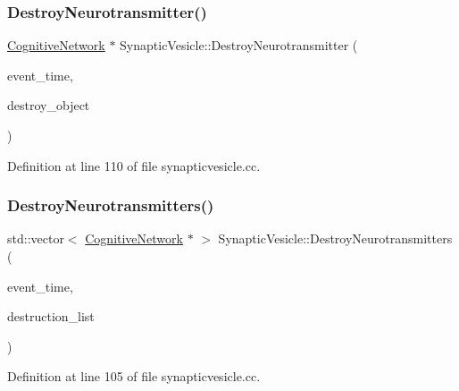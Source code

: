 \subsubsection{\texorpdfstring{Destroy\+Neurotransmitter()}{DestroyNeurotransmitter()}}
{\footnotesize\ttfamily \mbox{\hyperlink{class_cognitive_network}{Cognitive\+Network}} $\ast$ Synaptic\+Vesicle\+::\+Destroy\+Neurotransmitter (\begin{DoxyParamCaption}\item[{std\+::chrono\+::time\+\_\+point$<$ \mbox{\hyperlink{universe_8h_a0ef8d951d1ca5ab3cfaf7ab4c7a6fd80}{Clock}} $>$}]{event\+\_\+time,  }\item[{\mbox{\hyperlink{class_cognitive_network}{Cognitive\+Network}} $\ast$}]{destroy\+\_\+object }\end{DoxyParamCaption})}



Definition at line 110 of file synapticvesicle.\+cc.

\mbox{\label{class_synaptic_vesicle_a37817cc68b212d89ef8aa08c73631cbb}} 
\subsubsection{\texorpdfstring{Destroy\+Neurotransmitters()}{DestroyNeurotransmitters()}}
{\footnotesize\ttfamily std\+::vector$<$ \mbox{\hyperlink{class_cognitive_network}{Cognitive\+Network}} $\ast$ $>$ Synaptic\+Vesicle\+::\+Destroy\+Neurotransmitters (\begin{DoxyParamCaption}\item[{std\+::chrono\+::time\+\_\+point$<$ \mbox{\hyperlink{universe_8h_a0ef8d951d1ca5ab3cfaf7ab4c7a6fd80}{Clock}} $>$}]{event\+\_\+time,  }\item[{std\+::vector$<$ \mbox{\hyperlink{class_cognitive_network}{Cognitive\+Network}} $\ast$$>$}]{destruction\+\_\+list }\end{DoxyParamCaption})}



Definition at line 105 of file synapticvesicle.\+cc.

\mbox{\label{class_synaptic_vesicle_a42a3ab6704c27ca55531864c46f0fc2b}} 
